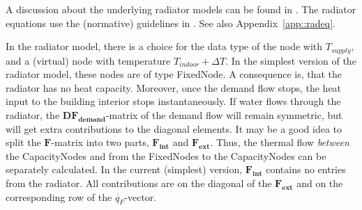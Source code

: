 A discussion about the underlying radiator models can be found in \cite{TolRadiator, TolThesis}. The radiator equations use the (normative) guidelines in \cite{NEN442}. See also Appendix~\ref{app::radeq}.

In the radiator model, there is a choice for the data type of the node with $T_{supply}$, and a (virtual) node with temperature $T_{indoor} + \Delta T$. In the simplest version of the radiator model, these nodes are of type \textsf{FixedNode}. A consequence is, that the radiator has no heat capacity. Moreover, once the demand flow stops, the heat input to the building interior stops instantaneously. If water flows through the radiator, the $\mathbf{DF_{demand}}$-matrix of the demand flow will remain symmetric, but will get extra contributions to the diagonal elements. It may be a good idea to split the $\mathbf{F}$-matrix into two parts, $\mathbf{F_{int}}$ and $\mathbf{F_{ext}}$. Thus, the thermal flow \emph{between} the \textsf{CapacityNodes} and from the \textsf{FixedNodes} to the \textsf{CapacityNodes} can be separately calculated. In the current (simplest) version, $\mathbf{F_{int}}$ contains no entries from the radiator. All contributions are on the diagonal of the $\mathbf{F_{ext}}$ and on the corresponding row of the $\dot{q_{F}}$-vector.

\newpage

